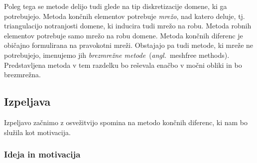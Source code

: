 \documentclass[12pt,a4paper,twoside]{article}
\theoremstyle{definition} %
\theoremstyle{plain} %
\numberwithin{equation}{section}
\newcommand{\ang}[1]{(\textit{angl.}\ #1)}
\begin{document}
Poleg tega se metode delijo tudi glede na tip diskretizacije domene, ki ga
potrebujejo. Metoda končnih elementov potrebuje \emph{mrežo}, nad katero deluje,
tj. triangulacijo notranjosti domene, ki inducira tudi mrežo na robu.
Metoda robnih elementov potrebuje samo mrežo na robu domene. Metoda končnih
diferenc je običajno formulirana na pravokotni mreži. Obstajajo pa tudi
metode, ki mreže ne potrebujejo, imenujemo jih \emph{brezmrežne
metode}~\ang{meshfree methods}. Predstavljena metoda v tem razdelku bo reševala
enačbo v močni obliki in bo brezmrežna.

\subsection{Izpeljava}

Izpeljavo začnimo z osvežitvijo spomina na metodo končnih diferenc, ki nam bo
služila kot motivacija.

\subsubsection{Ideja in motivacija}
\end{document}
